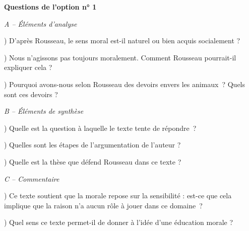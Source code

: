 \documentclass[french,12pt]{article}
\newcommand{\elementsAnalyseA}{D'après Rousseau, le sens moral est-il naturel ou bien acquis socialement ?}
\newcommand{\elementsAnalyseB}{Nous n'agissons pas toujours moralement. Comment Rousseau pourrait-il expliquer cela ?}
\newcommand{\elementsAnalyseC}{Pourquoi avons-nous selon Rousseau des devoirs envers \linebreak les animaux~? Quels sont ces devoirs ?}
\newcommand{\elementsSyntheseA}{Quelle est la question à laquelle le texte tente de répondre~?}
\newcommand{\elementsSyntheseB}{Quelles sont les étapes de l'argumentation de l'auteur ?}
\newcommand{\elementsSyntheseC}{Quelle est la thèse que défend Rousseau dans ce texte ?}
\newcommand{\commentaireA}{Ce texte soutient que la morale repose sur la sensibilité : est-ce que cela implique que la raison n'a aucun rôle à jouer dans ce domaine~?}
\newcommand{\commentaireB}{Quel sens ce texte permet-il de donner à l'idée d'une éducation morale ?}
\begin{document}
\leftskip=0cm
\large{\noindent \textbf{Questions de l’option n° 1}

\vspace*{0.5cm}

\noindent \textit{A – Éléments d'analyse}

\leftskip=1cm
\begin{analyse}
\hyphenchar{}
) \elementsAnalyseA

) \elementsAnalyseB

) \elementsAnalyseC

\end{analyse}

\vspace*{0.5cm}

\leftskip=0cm
\noindent \textit{B – Éléments de synthèse}

\leftskip=1cm
\begin{synthese}
\hyphenchar{}
) \elementsSyntheseA

) \elementsSyntheseB

) \elementsSyntheseC
\end{synthese}

\vspace*{0.5cm}

\leftskip=0cm
\noindent \textit{C – Commentaire}

\leftskip=1cm
\begin{commentaire}
\hyphenchar{}
) \commentaireA

) \commentaireB
\end{commentaire}

}
\end{document}
